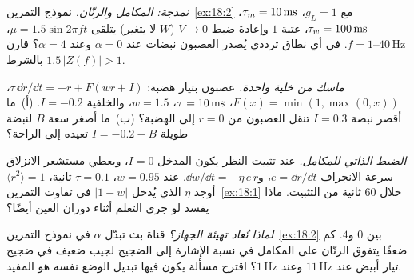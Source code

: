 \begin{exercise}[\lvlB]
\label{ex:18:4}
\emph{نمذجة: المكامل والرنّان.} نموذج التمرين~\ref{ex:18:2} مع $g_L=1$، $\tau_m=10\,\text{ms}$، $\tau_w=100\,\text{ms}$، عتبة $1$ وإعادة ضبط $V\to0$ ($W$ لا يتغير) يتلقى $\mu=1.5\sin2\pi ft$، $f=1\text{--}40\,\text{Hz}$. في أي نطاق ترددي يُصدر العصبون نبضات عند $\alpha=0$ وعند $\alpha=4$؟ قارن بالشرط $1.5\,|Z(f)|>1$.
\end{exercise}

\begin{exercise}[\lvlB]
\label{ex:18:5}
\emph{ماسك من خلية واحدة.} عصبون بتيار هضبة: $\tau\,\dd r/\dd t=-r+F(wr+I)$، $F(x)=\min(1,\max(0,x))$، $\tau=10\,\text{ms}$، $w=1.5$، والخلفية $I=-0.2$. (أ)~ما أقصر نبضة $I=0.3$ تنقل العصبون من $r=0$ إلى الهضبة؟ (ب)~ما أصغر سعة $B$ لنبضة طويلة $I=-0.2-B$ تعيده إلى الراحة؟
\end{exercise}

\begin{exercise}[\lvlB]
\label{ex:18:6}
\emph{الضبط الذاتي للمكامل.} عند تثبيت النظر يكون المدخل $I=0$، ويعطي مستشعر الانزلاق سرعة الانجراف $e=\dd r/\dd t$، و$\dd w/\dd t=-\eta\,e\,r$. عند $w=0.95$، $\tau=0.1$ ثانية، $\langle r^2\rangle=1$ أوجد $\eta$ الذي يُدخل $|1-w|$ في تفاوت التمرين~\ref{ex:18:1} خلال $60$ ثانية من التثبيت. ماذا يفسد لو جرى التعلم أثناء دوران العين أيضًا؟
\end{exercise}

\begin{exercise}[\lvlC]
\label{ex:18:7}
\emph{لماذا تُعاد تهيئة الجهاز؟} قناة بث تبدّل $\alpha$ في نموذج التمرين~\ref{ex:18:2} بين $0$ و$4$. كم ضعفًا يتفوق الرنّان على المكامل في نسبة الإشارة إلى الضجيج لجيب ضعيف في ضجيج تيار أبيض عند $11\,\text{Hz}$ وعند $1\,\text{Hz}$؟ اقترح مسألة يكون فيها تبديل الوضع نفسه هو المفيد.
\end{exercise}
